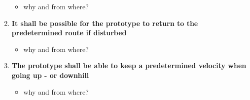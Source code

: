 \begin{enumerate}
	\begin{itemize}
	\item[] why and from where?
	\end{itemize}
\item \textbf{It shall be possible for the prototype to return to the predetermined route if disturbed}
	\begin{itemize}
	\item[] why and from where?
	\end{itemize}
\item \textbf{The prototype shall be able to keep a predetermined velocity when going up - or downhill}
	\begin{itemize}
	\item[] why and from where?
	\end{itemize}
\end{enumerate}

